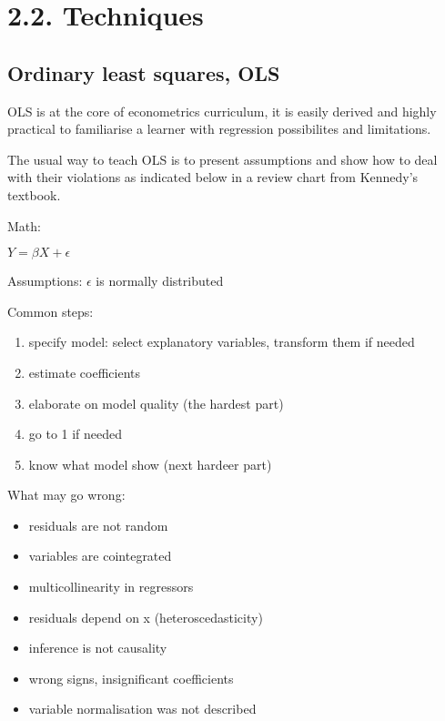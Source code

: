 \documentclass[letterpaper,10pt,english]{sphinxmanual}
\begin{document}
\section{2.2. Techniques}
\label{\detokenize{topics:techniques}}

\subsection{Ordinary least squares, OLS}
\label{\detokenize{techniques/ols::doc}}\label{\detokenize{techniques/ols:ordinary-least-squares-ols}}
OLS is at the core of econometrics curriculum, it is easily derived and
highly practical to familiarise a learner with regression possibilites
and limitations.

The usual way to teach OLS is to present assumptions and show how to deal
with their violations as indicated below in a review chart from Kennedy’s
textbook.

\noindent{}

Math:

\(Y = \beta X + \epsilon\)

Assumptions: \(\epsilon\) is normally distributed

Common steps:
\begin{enumerate}
\item {} 
specify model: select explanatory variables, transform them if needed

\item {} 
estimate coefficients

\item {} 
elaborate on model quality (the hardest part)

\item {} 
go to 1 if needed

\item {} 
know what model  show (next hardeer part)

\end{enumerate}

What may go wrong:
\begin{itemize}
\item {} 
residuals are not random

\item {} 
variables are cointegrated

\item {} 
multicollinearity in regressors

\item {} 
residuals depend on x (heteroscedasticity)

\item {} 
inference is not causality

\item {} 
wrong signs, insignificant coefficients

\item {} 
variable normalisation was not described

\end{itemize}
\end{document}
